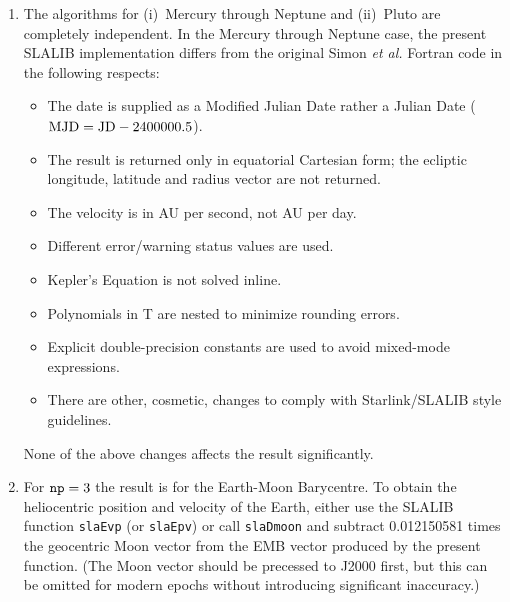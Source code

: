 \documentclass[11pt,fleqn,twoside]{article}
\renewcommand{\_}{{\tt\char'137}}     %
\begin{document}
{\begin{enumerate}
        For all except Pluto, over the period 1000-3000,
        the accuracy is better than 1.5
        times that over 1800-2200.  Outside the interval 1000-3000 the
        accuracy declines.  For Pluto the accuracy declines rapidly
        outside the period 1885-2099.  Outside these ranges
        (1885-2099 for Pluto, 1000-3000 for the rest) a ``date out
        of range'' warning status (${\tt jstat}=+1$) is returned.
  \item The algorithms for (i)~Mercury through Neptune and
        (ii)~Pluto are completely independent.  In the Mercury
        through Neptune case, the present SLALIB
        implementation differs from the original
        Simon {\it et al.}\/ Fortran code in the following respects:
        \begin{itemize}
         \item The date is supplied as a Modified Julian Date rather
               a Julian Date (${\rm MJD} = {\rm JD} - 2400000.5$).
         \item The result is returned only in equatorial
               Cartesian form;  the ecliptic
               longitude, latitude and radius vector are not returned.
         \item The velocity is in AU per second, not AU per day.
         \item Different error/warning status values are used.
         \item Kepler's Equation is not solved inline.
         \item Polynomials in T are nested to minimize rounding errors.
         \item Explicit double-precision constants are used to avoid
               mixed-mode expressions.
         \item There are other, cosmetic, changes to comply with
               Starlink/SLALIB style guidelines.
        \end{itemize}
        None of the above changes affects the result significantly.
  \item For ${\tt np} = 3$ the result is
        for the Earth-Moon Barycentre.  To
        obtain the heliocentric position and velocity of the Earth,
        either use the SLALIB function {\tt slaEvp} (or {\tt slaEpv})
        or call {\tt slaDmoon} and
        subtract 0.012150581 times the geocentric Moon vector from
        the EMB vector produced by the present function.  (The Moon
        vector should be precessed to J2000 first, but this can
        be omitted for modern epochs without introducing significant
        inaccuracy.)
 \end{enumerate}
}
\end{document}
